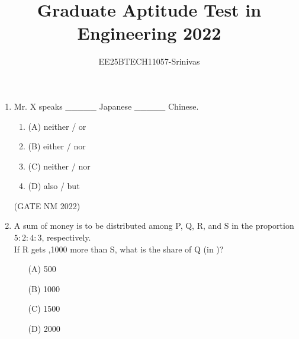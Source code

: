 \documentclass[journal,12pt,onecolumn]{IEEEtran}
\title{Graduate Aptitude Test in Engineering 2022}
\author{EE25BTECH11057-Srinivas}
\theoremstyle{remark}
\begin{document}
{\maketitle}




\begin{enumerate}
	\item  Mr. X speaks \_\_\_\_\_   Japanese \_\_\_\_\_  Chinese.\\[8pt]
		\begin{multicols}{4}

\begin {enumerate}

\item [(A)] neither / or \\
\item [(B)] either / nor \\
\item [(C)] neither / nor \\
\item [(D)] also / but \\

\end{enumerate}
\end{multicols}

\hfill(GATE NM 2022) \\





\item  A sum of money is to be distributed among P, Q, R, and S in the proportion $5 : 2 : 4 : 3$, respectively.\\[6pt]
If R gets \rupee,1000 more than S, what is the share of Q (in \rupee)?\\[8pt]

\begin{multicols}{4}

\begin{enumerate}

	\item[(A)] 500 \\
	\item[(B)] 1000 \\
	\item[(C)] 1500 \\
	\item[(D)] 2000 \\

\end{enumerate}

\end{multicols}


\end{enumerate}
\end{document}
